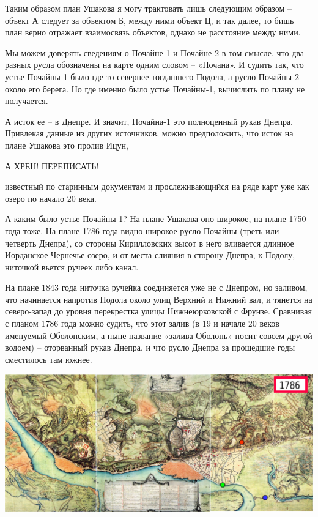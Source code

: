 Таким образом план Ушакова я могу трактовать лишь следующим образом – объект А следует за объектом Б, между ними объект Ц, и так далее, то бишь план верно отражает взаимосвязь объектов, однако не расстояние между ними.

Мы можем доверять сведениям о Почайне-1 и Почай\-не-2 в том смысле, что два разных русла обозначены на карте одним словом – «Почана». И судить так, что устье Почайны-1 было где-то севернее тогдашнего Подола, а русло Почайны-2 – около его берега. Но где именно было устье Почайны-1, вычислить по плану не получается.

А исток ее – в Днепре. И значит, Почайна-1 это полноценный рукав Днепра. Привлекая данные из других источников, можно предположить, что исток на плане Ушакова это пролив Ицун,

А ХРЕН! ПЕРЕПИСАТЬ!

 известный по старинным документам и прослеживающийся на ряде карт уже как озеро по начало 20 века.

А каким было устье Почайны-1? На плане Ушакова оно широкое, на плане 1750 года тоже. На плане 1786 года видно широкое русло Почайны (треть или четверть Днепра), со стороны Кирилловских высот в него вливается длинное Иорданское-Чернечье озеро, и от места слияния в сторону Днепра, к Подолу, ниточкой вьется ручеек либо канал.

На плане 1843 года ниточка ручейка соединяется уже не с Днепром, но заливом, что начинается напротив Подола около улиц Верхний и Нижний вал, и тянется на северо-запад до уровня перекрестка улицы Нижнеюрковской с Фрунзе. Сравнивая с планом 1786 года можно судить, что этот залив (в 19 и начале 20 веков именуемый Оболонским, а ныне название «залива Оболонь» носит совсем другой водоем) – оторванный рукав Днепра, и что русло Днепра за прошедшие годы сместилось там южнее.

\newpage

\begin{center}
\includegraphics[width=0.92\linewidth]{chast-colebanie-osnov/pochayna/1786-po.jpg}
\end{center}

